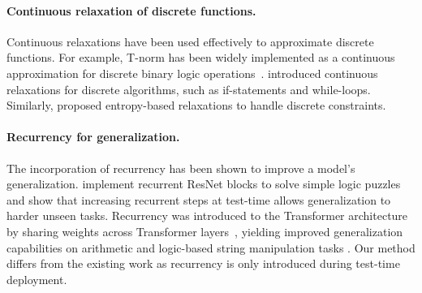 
\paragraph{Continuous relaxation of discrete functions.}
Continuous relaxations have been used effectively to approximate discrete functions. For example, T-norm has been widely implemented as a continuous approximation for discrete binary logic operations~\cite{ddlg,tnorm, jaxplan}. \citet{petersen2021learning} introduced continuous relaxations for discrete algorithms, such as if-statements and while-loops. Similarly, \citet{drn} proposed entropy-based relaxations to handle discrete constraints.


\paragraph{Recurrency for generalization.}
The incorporation of recurrency has been shown to improve a model's generalization. \citet{recurrent-algo2022} implement recurrent ResNet blocks to solve simple logic puzzles and show that increasing recurrent steps at test-time allows generalization to harder unseen tasks. Recurrency was introduced to the Transformer architecture by sharing weights across Transformer layers~\cite{universal-transformer, takase2021lessons}, yielding improved generalization capabilities on arithmetic and logic-based string manipulation tasks \cite{abacus-embedding, loopedtransformers}. Our method differs from the existing work as recurrency is only introduced during test-time deployment.